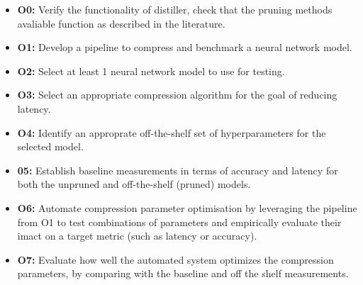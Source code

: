\documentclass[../Dissertation.tex]{subfiles}
\begin{document}
\begin{itemize}
    \item \textbf{O0:}\label{obj:VerifyComp} Verify the functionality of distiller, check that the pruning methods avaliable function as described in the literature.
    \item \textbf{O1:}\label{obj:BuildPipeline} Develop a pipeline to compress and benchmark a neural network model.
    \item \textbf{O2:}\label{obj:ModelSel} Select at least 1 neural network model to use for testing.
    \item \textbf{O3:}\label{obj:SelCompress} Select an appropriate compression algorithm for the goal of reducing latency.
    \item \textbf{O4:}\label{obj:OTSparams} Identify an approprate off-the-shelf set of hyperparameters for the selected model.
    \item \textbf{05:}\label{obj:baselines} Establish baseline measurements in terms of accuracy and latency for both the unpruned and off-the-shelf (pruned) models. 
    \item \textbf{O6:}\label{obj:AutoParams} Automate compression parameter optimisation by leveraging the pipeline from O1 to test combinations of parameters and empirically evaluate their imact on a target metric (such as latency or accuracy). 
    \item \textbf{O7:}\label{obj:EvaluateResutls} Evaluate how well the automated system optimizes the compression parameters, by comparing with the baseline and off the shelf measurements.

\end{itemize}
\end{document}
